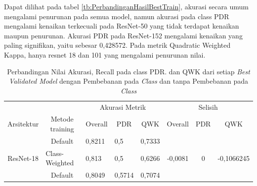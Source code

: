 Dapat dilihat pada tabel \ref{tb:PerbandinganHasilBestTrain}, akurasi secara umum mengalami penurunan pada semua model, namun akurasi pada class PDR mengalami kenaikan terkecuali pada ResNet-50 yang tidak terdapat kenaikan maupun penurunan. Akurasi PDR pada ResNet-152 mengalami kenaikan yang paling signifikan, yaitu sebesar 0,428572. Pada metrik Quadratic Weighted Kappa, hanya resnet 18 dan 101 yang mengalami penurunan nilai.
\begin{table}[hbtp]
	\begin{center}
	\caption{Perbandingan Nilai Akurasi, Recall pada class PDR. dan QWK dari setiap \emph{Best Validated Model} dengan Pembebanan pada \emph{Class} dan tanpa Pembebanan pada \emph{Class}}
	\label{tb:PerbandinganHasilBestVal}
	\begin{tabular}{|c|c|lll|ccc|}
		\hline
		\cellcolor[HTML]{C0C0C0}                             & \cellcolor[HTML]{C0C0C0}                                  & \multicolumn{3}{c|}{\cellcolor[HTML]{C0C0C0}Akurasi Metrik}                           & \multicolumn{3}{c|}{\cellcolor[HTML]{C0C0C0}Selisih}                                                                            \\ \cline{3-8} 
		\multirow{-2}{*}{\cellcolor[HTML]{C0C0C0}Arsitektur} & \multirow{-2}{*}{\cellcolor[HTML]{C0C0C0}Metode training} & \multicolumn{1}{c|}{Overall} & \multicolumn{1}{c|}{PDR}    & \multicolumn{1}{c|}{QWK} & \multicolumn{1}{c|}{Overall}                   & \multicolumn{1}{c|}{PDR}                        & QWK                          \\ \hline
															 & Default                                                   & \multicolumn{1}{l|}{0,8211}  & \multicolumn{1}{l|}{0,5}    & 0,7333                   & \multicolumn{1}{c|}{}                          & \multicolumn{1}{c|}{}                           &                              \\ \cline{2-5}
		\multirow{-2}{*}{ResNet-18}                          & \multicolumn{1}{l|}{Class-Weighted}                       & \multicolumn{1}{l|}{0,813}   & \multicolumn{1}{l|}{0,5}    & 0,6266                   & \multicolumn{1}{c|}{\multirow{-2}{*}{-0,0081}} & \multicolumn{1}{c|}{\multirow{-2}{*}{0}}        & \multirow{-2}{*}{-0,1066245} \\ \hline
															 & Default                                                   & \multicolumn{1}{l|}{0,8049}  & \multicolumn{1}{l|}{0,5714} & 0,7074                   & \multicolumn{1}{c|}{}                          & \multicolumn{1}{c|}{}                           &                              \\ \cline{2-5}

\end{tabular}
\end{center}
\end{table}
